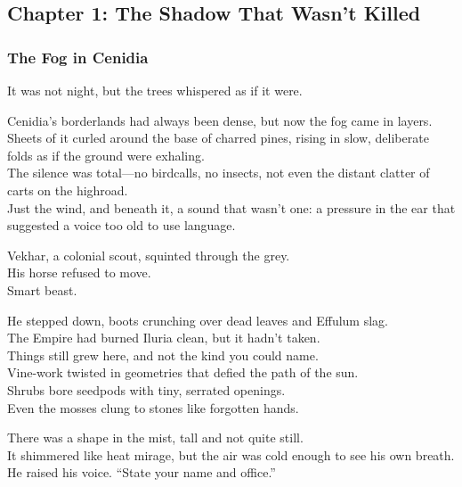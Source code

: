 \documentclass[12pt]{article}
\begin{document}
\newpage

\subsection{Chapter 1: The Shadow That Wasn’t Killed}

\vspace{.5in}

\subsubsection{The Fog in Cenidia}

It was not night, but the trees whispered as if it were.

Cenidia’s borderlands had always been dense, but now the fog came in layers.\\
Sheets of it curled around the base of charred pines, rising in slow, deliberate folds as if the ground were exhaling.\\
The silence was total—no birdcalls, no insects, not even the distant clatter of carts on the highroad.\\
Just the wind, and beneath it, a sound that wasn’t one: a pressure in the ear that suggested a voice too old to use language.

\vspace{1em}

Vekhar, a colonial scout, squinted through the grey.\\
His horse refused to move.\\
Smart beast.

He stepped down, boots crunching over dead leaves and Effulum slag.\\
The Empire had burned Iluria clean, but it hadn’t taken.\\
Things still grew here, and not the kind you could name.\\
Vine-work twisted in geometries that defied the path of the sun.\\
Shrubs bore seedpods with tiny, serrated openings.\\
Even the mosses clung to stones like forgotten hands.

\vspace{1em}

There was a shape in the mist, tall and not quite still.\\
It shimmered like heat mirage, but the air was cold enough to see his own breath.\\
He raised his voice. “State your name and office.”
\end{document}

